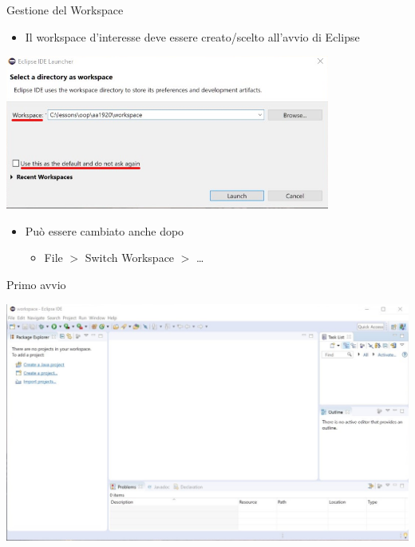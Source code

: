 \documentclass[presentation]{beamer}
\begin{document}
\begin{frame}{Gestione del Workspace}
\begin{itemize}
\item Il workspace d'interesse deve essere creato/scelto all'avvio di Eclipse
\end{itemize}
\begin{center}
\includegraphics[width=0.8\textwidth]{img/eclipse-screenshots/eclipse-ide-00.png}
\end{center}
\begin{itemize}
\item Può essere cambiato anche dopo
\begin{itemize}
\item File $>$ Switch Workspace $>$ \dots
\end{itemize}
\end{itemize}
\end{frame}

\begin{frame}{Primo avvio}
\begin{center}
\includegraphics[width=\textwidth]{img/eclipse-screenshots/eclipse-ide-01.jpg}
\end{center}
\end{frame}
\end{document}
